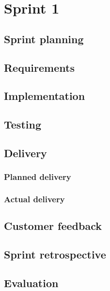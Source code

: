 \section{Sprint 1}

\subsection{Sprint planning}
\subsection{Requirements}
\subsection{Implementation}
\subsection{Testing}
\subsection{Delivery}
\subsubsection{Planned delivery}
\subsubsection{Actual delivery}
\subsection{Customer feedback}
\subsection{Sprint retrospective}
\subsection{Evaluation}
